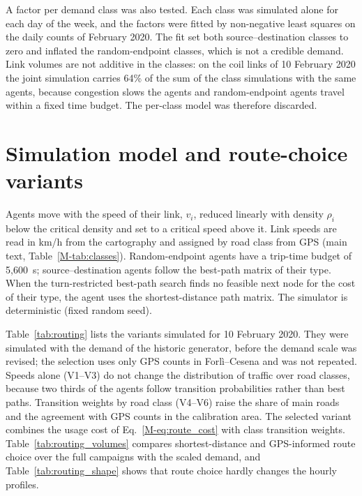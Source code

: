 \documentclass[11pt,a4paper]{article}
\begin{document}


A factor per demand class was also tested. Each class was simulated alone for each day of the week, and the factors were fitted by non-negative least squares on the daily counts of February 2020. The fit set both source--destination classes to zero and inflated the random-endpoint classes, which is not a credible demand. Link volumes are not additive in the classes: on the coil links of 10 February 2020 the joint simulation carries 64\% of the sum of the class simulations with the same agents, because congestion slows the agents and random-endpoint agents travel within a fixed time budget. The per-class model was therefore discarded.

\section{Simulation model and route-choice variants}
\label{sec:routing}

Agents move with the speed of their link, $v_i$, reduced linearly with density $\rho_i$ below the critical density and set to a critical speed above it. Link speeds are read in km/h from the cartography and assigned by road class from GPS (main text, Table~\ref{M-tab:classes}). Random-endpoint agents have a trip-time budget of 5,600~s; source--destination agents follow the best-path matrix of their type. When the turn-restricted best-path search finds no feasible next node for the cost of their type, the agent uses the shortest-distance path matrix. The simulator is deterministic (fixed random seed).

Table~\ref{tab:routing} lists the variants simulated for 10 February 2020. They were simulated with the demand of the historic generator, before the demand scale was revised; the selection uses only GPS counts in Forl\`i--Cesena and was not repeated. Speeds alone (V1--V3) do not change the distribution of traffic over road classes, because two thirds of the agents follow transition probabilities rather than best paths. Transition weights by road class (V4--V6) raise the share of main roads and the agreement with GPS counts in the calibration area. The selected variant combines the usage cost of Eq.~\eqref{M-eq:route_cost} with class transition weights. Table~\ref{tab:routing_volumes} compares shortest-distance and GPS-informed route choice over the full campaigns with the scaled demand, and Table~\ref{tab:routing_shape} shows that route choice hardly changes the hourly profiles.
\end{document}
